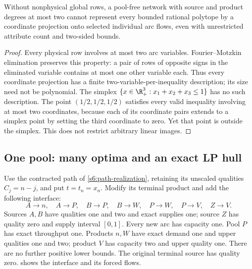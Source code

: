 \begin{proposition}\label{s6:ports}
Without nonphysical global rows, a pool-free network with source and
product degrees at most two cannot represent every bounded rational
polytope by a coordinate projection onto selected individual arc flows,
even with unrestricted attribute count and two-sided bounds.
\end{proposition}
\begin{proof}
Every physical row involves at most two arc variables. Fourier--Motzkin
elimination preserves this property: a pair of rows of opposite signs
in the eliminated variable contains at most one other variable each.
Thus every coordinate projection has a finite two-variable-per-inequality
description; its size need not be polynomial. The simplex
$\{x\in\R_+^3:x_1+x_2+x_3\le1\}$ has no such description.
The point $(1/2,1/2,1/2)$ satisfies every valid inequality involving at
most two coordinates, because each of its coordinate pairs extends to
a simplex point by setting the third coordinate to zero. Yet that point
is outside the simplex. This does not restrict arbitrary linear images.
\end{proof}

\subsection{One pool: many optima and an exact LP hull}\label{s6:geometry}
Use the contracted path of \cref{s6:path-realization}, retaining its
unscaled qualities $C_j=n-j$, and put $t=t_n=x_n$. Modify its terminal
product and add the following interface:
\[
 A\to n,\quad A\to P,\quad B\to P,\quad B\to W,\quad
 P\to W,\quad P\to V,\quad Z\to V.
\]
Sources $A,B$ have qualities one and two and exact supplies one;
source $Z$ has quality zero and supply interval $[0,1]$. Every new arc
has capacity one. Pool $P$ has exact throughput one. Products $n,W$
have exact demand one and upper qualities one and two; product $V$ has
capacity two and upper quality one. There are no further positive
lower bounds. The original terminal source has quality zero.
 shows the interface and its forced flows.


